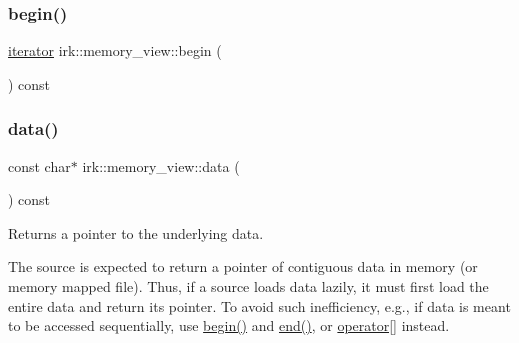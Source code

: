 \mbox{\label{classirk_1_1memory__view_a41d2227984ac0284ec52588a57bd297c}} 
\subsubsection{\texorpdfstring{begin()}{begin()}}
{\footnotesize\ttfamily \mbox{\hyperlink{classirk_1_1memory__view_1_1iterator}{iterator}} irk\+::memory\+\_\+view\+::begin (\begin{DoxyParamCaption}{ }\end{DoxyParamCaption}) const\hspace{0.3cm}{\ttfamily [inline]}}

\mbox{\label{classirk_1_1memory__view_ab55150c13cf7e380aaaeda8d70d24bed}} 
\subsubsection{\texorpdfstring{data()}{data()}}
{\footnotesize\ttfamily const char$\ast$ irk\+::memory\+\_\+view\+::data (\begin{DoxyParamCaption}{ }\end{DoxyParamCaption}) const\hspace{0.3cm}{\ttfamily [inline]}}



Returns a pointer to the underlying data. 

The source is expected to return a pointer of contiguous data in memory (or memory mapped file). Thus, if a source loads data lazily, it must first load the entire data and return its pointer. To avoid such inefficiency, e.\+g., if data is meant to be accessed sequentially, use \mbox{\hyperlink{classirk_1_1memory__view_a41d2227984ac0284ec52588a57bd297c}{begin()}} and \mbox{\hyperlink{classirk_1_1memory__view_a393e04a837ff706e408fbea11219d7ed}{end()}}, or \mbox{\hyperlink{classirk_1_1memory__view_a944d6187b25fdf17347959362c55a9da}{operator\mbox{[}\mbox{]}}} instead. \mbox{\label{classirk_1_1memory__view_a393e04a837ff706e408fbea11219d7ed}} 
